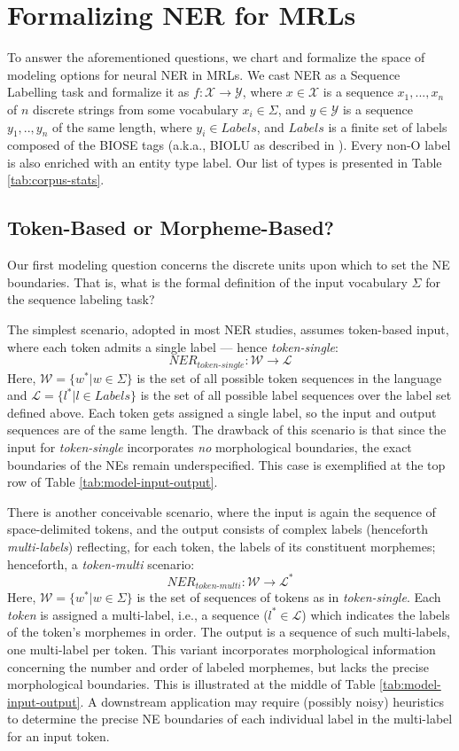 \documentclass[11pt,a4paper]{article}
\newcommand{\TOKMACRO}{{\em token-single}\xspace}
\newcommand{\MULMACRO}{{\em token-multi}\xspace}
\begin{document}
\section{Formalizing NER for MRLs}
To answer the aforementioned questions, we  chart and formalize the space of  modeling options for neural NER in MRLs. 
We cast   NER   as a Sequence Labelling task and  formalize it as \(f:\mathcal{X}\rightarrow\mathcal{Y}\), where \(x\in\mathcal{X}\) is a sequence \(x_1,...,x_n\) of \(n\) discrete strings from some vocabulary \( x_i\in \Sigma\), and \(y\in \mathcal{Y}\) is a sequence \(y_1,..,y_n\) of the same length,  where \( y_i\in Labels\), and \(Labels\) is a finite set of labels composed of the BIOSE  tags (a.k.a., BIOLU as described in \citet{ratinov-roth-2009-design}).  Every non-O label is also enriched with an entity type label. Our list of types is presented in Table \ref{tab:corpus-stats}. 

\subsection{Token-Based or Morpheme-Based?}
Our first modeling question concerns the discrete units upon which to set the NE boundaries. That is, what is  the  formal definition of the input vocabulary \(\Sigma\) for the sequence labeling task?

The simplest scenario,  adopted in most NER studies,
assumes token-based input, where each token admits a single label --- hence \TOKMACRO:
\[ \textit{NER}_\textit{token-single} : \mathcal{W} \rightarrow \mathcal{L}\]
Here, \(\mathcal{W} = \{w^*| w\in \Sigma\}\) is the set of all possible token sequences in the language and  \(\mathcal{L} = \{l^*| l\in Labels\}\) is the set of all possible label sequences over the label set defined above. 
Each token gets assigned a single label, so the input and output sequences are of the same length. The drawback of this scenario is that since the input for \TOKMACRO  incorporates {\em no} morphological boundaries, the exact boundaries of the NEs remain underspecified. This case is exemplified at the top row of Table \ref{tab:model-input-output}.

There is another conceivable scenario, where the input is again the sequence of space-delimited tokens, and the output consists of complex labels (henceforth {\em multi-labels}) reflecting, for each  token, the labels of its constituent morphemes; henceforth, a \MULMACRO scenario:
\[ \textit{NER}_\textit{token-multi} : \mathcal{W} \rightarrow \mathcal{L}^*\]
Here, \(\mathcal{W} = \{w^*| w\in \Sigma\}\) is the set of sequences of  tokens as in \TOKMACRO.   
Each {\em token} is assigned a multi-label, i.e., a {sequence}  (\(l^* \in \mathcal{L}\))     which indicates the labels of the token's  morphemes in  order. The output is a sequence of such multi-labels, one multi-label per token. 
This variant incorporates  morphological information concerning the number and order of  labeled morphemes, but lacks the precise morphological boundaries. This is illustrated at the middle of Table \ref{tab:model-input-output}. A downstream application may require (possibly noisy) heuristics to determine the precise NE boundaries of each individual label in the multi-label for an input token.
\end{document}
